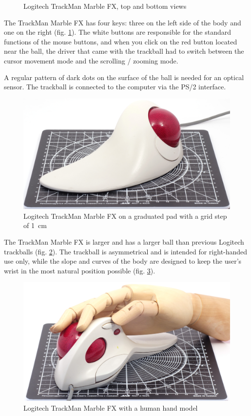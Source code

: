 \documentclass[11pt, a4paper]{article}
\begin{document}
\begin{figure}[h]
    \caption{Logitech TrackMan Marble FX, top and bottom views}
    \label{fig:trackmanTopAndBottom}
\end{figure}

The TrackMan Marble FX has four keys: three on the left side of the body and one on the right (fig. \ref{fig:trackmanTopAndBottom}).
The white buttons are responsible for the standard functions of the mouse buttons, and when you click on the red button located near the ball, the driver that came with the trackball had to switch between the cursor movement mode and the scrolling / zooming mode.

A regular pattern of dark dots on the surface of the ball is needed for an optical sensor. The trackball is connected to the computer via the PS/2 interface.

\begin{figure}[h]
    \centering
    \includegraphics[scale=0.4]{1998_logitech_trackman_marble_fx/size_30.jpg}
    \caption{Logitech TrackMan Marble FX on a graduated pad with a grid step of 1~cm}
    \label{fig:trackmanSize}
\end{figure}

The TrackMan Marble FX is larger and has a larger ball than previous Logitech trackballs (fig. \ref{fig:trackmanSize}). The trackball is asymmetrical and is intended for right-handed use only, while the slope and curves of the body are designed to keep the user's wrist in the most natural position possible (fig. \ref{fig:trackmanHand}).

\begin{figure}[h]
    \centering
    \includegraphics[scale=0.6]{1998_logitech_trackman_marble_fx/hand_30.jpg}
    \caption{Logitech TrackMan Marble FX with a human hand model}
    \label{fig:trackmanHand}
\end{figure}
\end{document}
